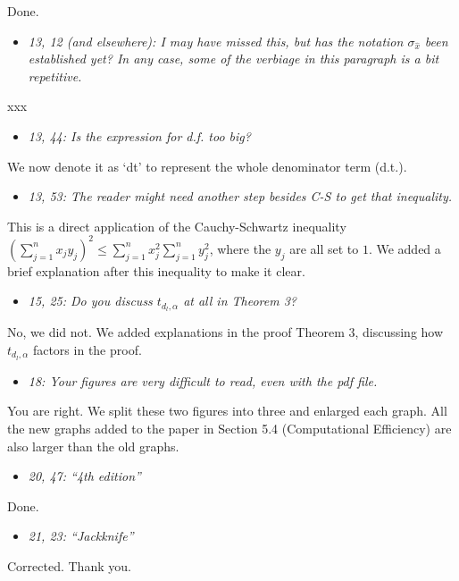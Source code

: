 \documentclass[11pt,notitlepage,onecolumn]{article}
\newcommand{\noi}{\noindent}
\begin{document}
\noi
Done.
\medskip 



\begin{itemize}
\item[] \textit{13, 12 (and elsewhere): I may have missed this, but has the notation $\sigma_{\hat{x}}$ been established yet? 
In any case, some of the verbiage in this paragraph is a bit repetitive.}
\end{itemize}

\noi
xxx  
\medskip 



\begin{itemize}
\item[] \textit{13, 44: Is the expression for d.f. too big?}
\end{itemize}

\noi
We now denote it as `dt' to represent the whole denominator term (d.t.). 
\medskip 



\begin{itemize}
\item[] \textit{13, 53: The reader might need another step besides C-S to get that inequality.}
\end{itemize}

\noi
This is a direct application of the Cauchy-Schwartz inequality $\left(\sum_{j=1}^{n}x_j y_j\right)^2 \leq \sum_{j=1}^{n}x_j^2 \sum_{j=1}^{n}y_j^2$, where the $y_j$ are all set to $1$. 
We added a brief explanation after this inequality to make it clear. 
\medskip 



\begin{itemize}
\item[] \textit{15, 25: Do you discuss $t_{d_l,\alpha}$ at all in Theorem 3?}
\end{itemize}

\noi
No, we did not.   
We added explanations in the proof Theorem 3, discussing how $t_{d_l,\alpha}$ factors in the proof. 
\medskip 



\begin{itemize}
\item[] \textit{18: Your figures are very difficult to read, even with the pdf file.}
\end{itemize}

\noi
You are right. 
We split these two figures into three and enlarged each graph. 
All the new graphs added to the paper in Section 5.4 (Computational Efficiency) are also larger than the old graphs.  
\medskip 



\begin{itemize}
\item[] \textit{20, 47: ``4th edition''}
\end{itemize}

\noi
Done.
\medskip 



\begin{itemize}
\item[] \textit{21, 23: ``\it Jackknife''}
\end{itemize}

\noi
Corrected. Thank you. 
\end{document}
